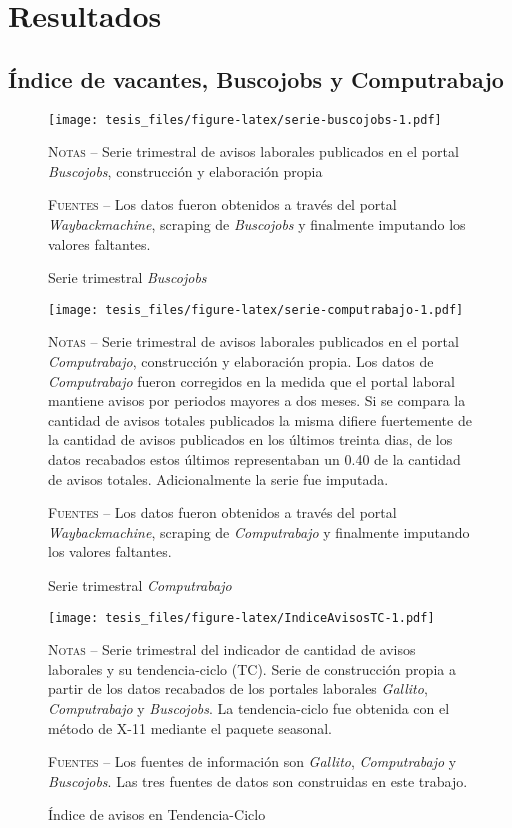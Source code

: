 \documentclass[12pt,oneside]{reedthesis}
\makeatletter
\def\maxwidth{ %
  \ifdim\Gin@nat@width>\linewidth
    \linewidth
  \else
    \Gin@nat@width
  \fi
}
\makeatother
\begin{document}
\hypertarget{resultados}{%
\section{Resultados}\label{resultados}}

\hypertarget{uxedndice-de-vacantes-buscojobs-y-computrabajo}{%
\subsection{Índice de vacantes, Buscojobs y Computrabajo}\label{uxedndice-de-vacantes-buscojobs-y-computrabajo}}
\begin{figure}
\texttt{[image: tesis\_files/figure-latex/serie-buscojobs-1.pdf]}
\caption{Serie trimestral \textit{Buscojobs}}\label{fig:serie-buscojobs}\textsc{}

\footnotesize\textsc{Notas} -- Serie trimestral de avisos laborales publicados en el portal \textit{Buscojobs}, construcción y elaboración propia

\textsc{Fuentes} -- Los datos fueron obtenidos a través del portal \textit{Waybackmachine}, scraping de \textit{Buscojobs} y finalmente imputando los valores faltantes.
\end{figure}
\begin{figure}
\texttt{[image: tesis\_files/figure-latex/serie-computrabajo-1.pdf]}
\caption{Serie trimestral \textit{Computrabajo}}\label{fig:serie-computrabajo}\textsc{}

\footnotesize\textsc{Notas} -- Serie trimestral de avisos laborales publicados en el portal \textit{Computrabajo}, construcción y elaboración propia. Los datos de \textit{Computrabajo} fueron corregidos en la medida que el portal laboral mantiene avisos por periodos mayores a dos meses. Si se compara la cantidad de avisos totales publicados la misma difiere fuertemente de la cantidad de avisos publicados en los últimos treinta dias, de los datos recabados estos últimos representaban un 0.40 de la cantidad de avisos totales. Adicionalmente la serie fue imputada.

\textsc{Fuentes} -- Los datos fueron obtenidos a través del portal \textit{Waybackmachine}, scraping de \textit{Computrabajo} y finalmente imputando los valores faltantes.
\end{figure}
\begin{figure}
\texttt{[image: tesis\_files/figure-latex/IndiceAvisosTC-1.pdf]}
\caption{Índice de avisos en Tendencia-Ciclo}\label{fig:IndiceAvisosTC}\textsc{}

\footnotesize\textsc{Notas} -- Serie trimestral del indicador de cantidad de avisos laborales y su tendencia-ciclo (TC). Serie de construcción propia a partir de los datos recabados de los portales laborales \textit{Gallito}, \textit{Computrabajo} y \textit{Buscojobs}. La tendencia-ciclo fue obtenida con el método de X-11 mediante el paquete seasonal.

\textsc{Fuentes} -- Los fuentes de información son \textit{Gallito}, \textit{Computrabajo} y \textit{Buscojobs}. Las tres fuentes de datos son construidas en este trabajo.
\end{figure}
\end{document}

